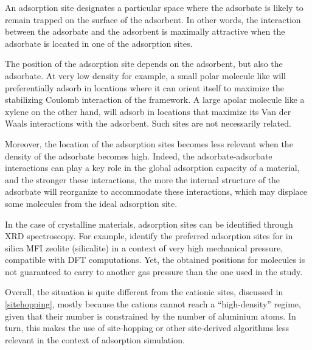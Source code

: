 \documentclass[main.tex]{subfiles}
\begin{document}

An adsorption site designates a particular space where the adsorbate is likely to remain trapped on the surface of the adsorbent. In other words, the interaction between the adsorbate and the adsorbent is maximally attractive when the adsorbate is located in one of the adsorption sites.

The position of the adsorption site depends on the adsorbent, but also the adsorbate. At very low density for example, a small polar molecule like  will preferentially adsorb in locations where it can orient itself to maximize the stabilizing Coulomb interaction of the framework. A large apolar molecule like a xylene on the other hand, will adsorb in locations that maximize its Van der Waals interactions with the adsorbent. Such sites are not necessarily related.

Moreover, the location of the adsorption sites becomes less relevant when the density of the adsorbate becomes high. Indeed, the adsorbate-adsorbate interactions can play a key role in the global adsorption capacity of a material, and the stronger these interactions, the more the internal structure of the adsorbate will reorganize to accommodate these interactions, which may displace some molecules from the ideal adsorption site.

In the case of crystalline materials, adsorption sites can be identified through XRD spectroscopy. For example, \textcite{CO2SitesInMFI} identify the preferred adsorption sites for  in silica MFI zeolite (silicalite) in a context of very high mechanical pressure, compatible with DFT computations. Yet, the obtained positions for  molecules is not guaranteed to carry to another gas pressure than the one used in the study.

Overall, the situation is quite different from the cationic sites, discussed in \cref{sitehopping}, mostly because the cations cannot reach a ``high-density'' regime, given that their number is constrained by the number of aluminium atoms. In turn, this makes the use of site-hopping or other site-derived algorithms less relevant in the context of adsorption simulation.
\end{document}
